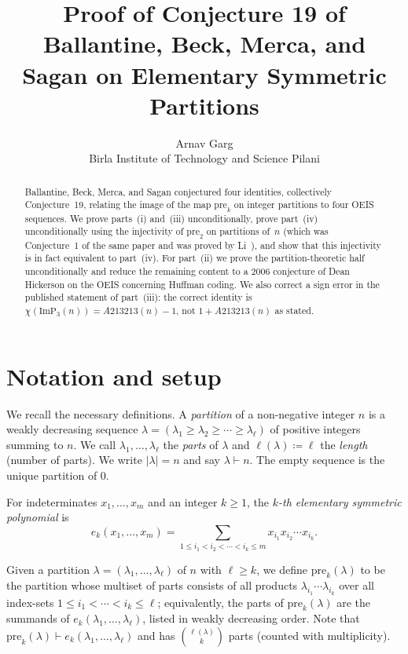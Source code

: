 \documentclass[11pt]{article}
\title{Proof of Conjecture 19 of Ballantine, Beck, Merca, and Sagan on Elementary Symmetric Partitions}
\author{Arnav Garg\\
\small Birla Institute of Technology and Science Pilani}
\date{}
\theoremstyle{remark}
\begin{document}
\maketitle

\begin{abstract}
Ballantine, Beck, Merca, and Sagan \cite{BBMS} conjectured four identities, collectively Conjecture~19, relating the image of the map $\mathrm{pre}_k$ on integer partitions to four OEIS sequences. We prove parts~(i) and~(iii) unconditionally, prove part~(iv) unconditionally using the injectivity of $\mathrm{pre}_2$ on partitions of~$n$ (which was Conjecture~1 of the same paper and was proved by Li~\cite{Li}), and show that this injectivity is in fact equivalent to part~(iv). For part~(ii) we prove the partition-theoretic half unconditionally and reduce the remaining content to a 2006 conjecture of Dean Hickerson on the OEIS concerning Huffman coding. We also correct a sign error in the published statement of part~(iii): the correct identity is $\chi(\mathrm{ImP}_3(n)) = A213213(n) - 1$, not $1 + A213213(n)$ as stated.
\end{abstract}

\section{Notation and setup}

We recall the necessary definitions. A \emph{partition} of a non-negative integer $n$ is a weakly decreasing sequence $\lambda = (\lambda_1 \geq \lambda_2 \geq \cdots \geq \lambda_\ell)$ of positive integers summing to $n$. We call $\lambda_1, \dots, \lambda_\ell$ the \emph{parts} of $\lambda$ and $\ell(\lambda) \coloneqq \ell$ the \emph{length} (number of parts). We write $|\lambda| = n$ and say $\lambda \vdash n$. The empty sequence is the unique partition of $0$.

For indeterminates $x_1, \dots, x_m$ and an integer $k \geq 1$, the \emph{$k$-th elementary symmetric polynomial} is
\[
e_k(x_1, \dots, x_m) = \sum_{1 \leq i_1 < i_2 < \cdots < i_k \leq m} x_{i_1} x_{i_2} \cdots x_{i_k}.
\]

Given a partition $\lambda = (\lambda_1, \dots, \lambda_\ell)$ of $n$ with $\ell \geq k$, we define $\mathrm{pre}_k(\lambda)$ to be the partition whose multiset of parts consists of all products $\lambda_{i_1} \cdots \lambda_{i_k}$ over all index-sets $1 \leq i_1 < \cdots < i_k \leq \ell$; equivalently, the parts of $\mathrm{pre}_k(\lambda)$ are the summands of $e_k(\lambda_1, \dots, \lambda_\ell)$, listed in weakly decreasing order. Note that $\mathrm{pre}_k(\lambda) \vdash e_k(\lambda_1,\dots,\lambda_\ell)$ and has $\binom{\ell(\lambda)}{k}$ parts (counted with multiplicity).
\end{document}
